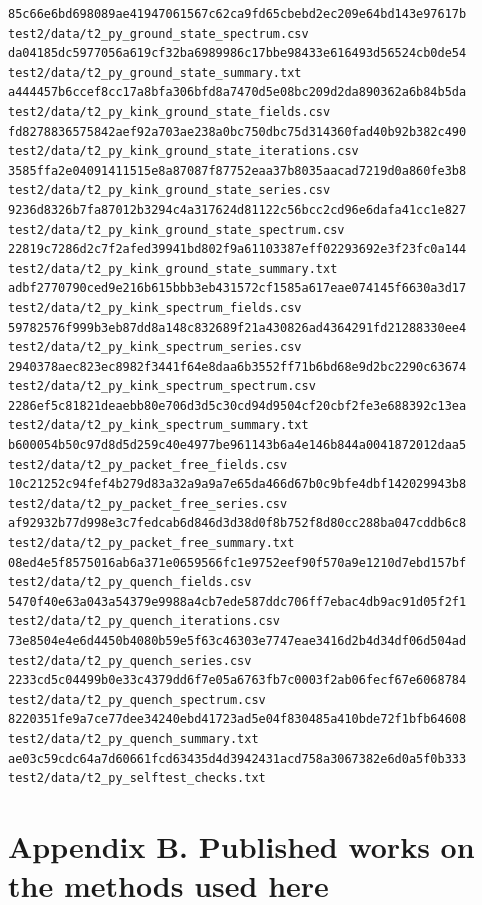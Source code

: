 \documentclass[
  10pt,
]{article}
\begin{document}
\begin{verbatim}
85c66e6bd698089ae41947061567c62ca9fd65cbebd2ec209e64bd143e97617b  test2/data/t2_py_ground_state_spectrum.csv
da04185dc5977056a619cf32ba6989986c17bbe98433e616493d56524cb0de54  test2/data/t2_py_ground_state_summary.txt
a444457b6ccef8cc17a8bfa306bfd8a7470d5e08bc209d2da890362a6b84b5da  test2/data/t2_py_kink_ground_state_fields.csv
fd8278836575842aef92a703ae238a0bc750dbc75d314360fad40b92b382c490  test2/data/t2_py_kink_ground_state_iterations.csv
3585ffa2e04091411515e8a87087f87752eaa37b8035aacad7219d0a860fe3b8  test2/data/t2_py_kink_ground_state_series.csv
9236d8326b7fa87012b3294c4a317624d81122c56bcc2cd96e6dafa41cc1e827  test2/data/t2_py_kink_ground_state_spectrum.csv
22819c7286d2c7f2afed39941bd802f9a61103387eff02293692e3f23fc0a144  test2/data/t2_py_kink_ground_state_summary.txt
adbf2770790ced9e216b615bbb3eb431572cf1585a617eae074145f6630a3d17  test2/data/t2_py_kink_spectrum_fields.csv
59782576f999b3eb87dd8a148c832689f21a430826ad4364291fd21288330ee4  test2/data/t2_py_kink_spectrum_series.csv
2940378aec823ec8982f3441f64e8daa6b3552ff71b6bd68e9d2bc2290c63674  test2/data/t2_py_kink_spectrum_spectrum.csv
2286ef5c81821deaebb80e706d3d5c30cd94d9504cf20cbf2fe3e688392c13ea  test2/data/t2_py_kink_spectrum_summary.txt
b600054b50c97d8d5d259c40e4977be961143b6a4e146b844a0041872012daa5  test2/data/t2_py_packet_free_fields.csv
10c21252c94fef4b279d83a32a9a9a7e65da466d67b0c9bfe4dbf142029943b8  test2/data/t2_py_packet_free_series.csv
af92932b77d998e3c7fedcab6d846d3d38d0f8b752f8d80cc288ba047cddb6c8  test2/data/t2_py_packet_free_summary.txt
08ed4e5f8575016ab6a371e0659566fc1e9752eef90f570a9e1210d7ebd157bf  test2/data/t2_py_quench_fields.csv
5470f40e63a043a54379e9988a4cb7ede587ddc706ff7ebac4db9ac91d05f2f1  test2/data/t2_py_quench_iterations.csv
73e8504e4e6d4450b4080b59e5f63c46303e7747eae3416d2b4d34df06d504ad  test2/data/t2_py_quench_series.csv
2233cd5c04499b0e33c4379dd6f7e05a6763fb7c0003f2ab06fecf67e6068784  test2/data/t2_py_quench_spectrum.csv
8220351fe9a7ce77dee34240ebd41723ad5e04f830485a410bde72f1bfb64608  test2/data/t2_py_quench_summary.txt
ae03c59cdc64a7d60661fcd63435d4d3942431acd758a3067382e6d0a5f0b333  test2/data/t2_py_selftest_checks.txt
\end{verbatim}

\hypertarget{appendix-b.-published-works-on-the-methods-used-here}{%
\section{Appendix B. Published works on the methods used
here}\label{appendix-b.-published-works-on-the-methods-used-here}}
\end{document}
